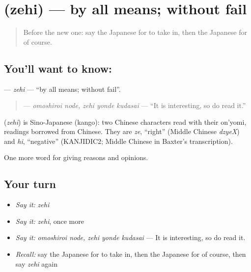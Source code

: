 \section[\texorpdfstring{\ja{ぜひ} (zehi)}{ぜひ (zehi)}]{ (zehi) — by all means; without fail}

\label{lesson:JA-C322-zehi}



\begin{quote}
Before the new one: say the Japanese for to take in, then the Japanese for of course.
\end{quote}

\subsection*{You'll want to know: }
\textbf{} — \emph{zehi} — \textquotedblleft{}by all means; without fail\textquotedblright{}.

\begin{quote}
\textbf{  } — \emph{omoshiroi node, zehi yonde kudasai} — \textquotedblleft{}It is interesting, so do read it.\textquotedblright{}
\end{quote}

\begin{cousinweb}
\textbf{} (\emph{zehi}) is Sino-Japanese (kango): two Chinese characters read with their on'yomi, readings borrowed from Chinese. They are \emph{ze}, \textquotedblleft{}right\textquotedblright{} (Middle Chinese \emph{dzyeX}) and \emph{hi}, \textquotedblleft{}negative\textquotedblright{} (KANJIDIC2; Middle Chinese in Baxter's transcription).
\end{cousinweb}

\begin{grammarlens}[title={What you've built}]
One more word for giving reasons and opinions.
\end{grammarlens}

\subsection*{Your turn}
\begin{itemize}
\raggedright
  \item \emph{Say it:} \emph{zehi}
  \item \emph{Say it:} \emph{zehi}, once more
  \item \emph{Say it:} \emph{omoshiroi node, zehi yonde kudasai} — It is interesting, so do read it.
  \item \emph{Recall:} say the Japanese for to take in, then the Japanese for of course, then say \emph{zehi} again
\end{itemize}

